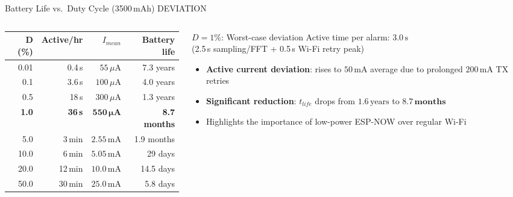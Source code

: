 \begin{frame}[shrink=15]{Battery Life vs.\ Duty Cycle (3500\,mAh) DEVIATION}
\begin{columns}[T,onlytextwidth]
\begin{column}{0.60\textwidth}
\centering
\renewcommand{\arraystretch}{1.5}
{\small
\setlength{\tabcolsep}{8pt}
\begin{tabular}{r r r r}
\toprule
\textbf{D (\%)} & \textbf{Active/hr} & \textbf{$I_{mean}$} & \textbf{Battery life} \\
\midrule
0.01 & 0.4\,s  & $55\,\mu\text{A}$  & 7.3 years \\
0.1  & 3.6\,s  & $100\,\mu\text{A}$ & 4.0 years \\
0.5  & 18\,s   & $300\,\mu\text{A}$ & 1.3 years \\
\rowcolor{sintefred!30}
\textbf{1.0} & \textbf{36\,s} & $\mathbf{550\,\mu\text{A}}$ & \textbf{8.7 months} \\
5.0  & 3\,min  & $2.55\,\text{mA}$  & 1.9 months \\
10.0 & 6\,min  & $5.05\,\text{mA}$  & 29 days \\
20.0 & 12\,min & $10.0\,\text{mA}$  & 14.5 days \\
50.0 & 30\,min & $25.0\,\text{mA}$  & 5.8 days \\
\bottomrule
\end{tabular}
}
\end{column}
\begin{column}{0.36\textwidth}
  \begin{block}{$D = 1\%$: Worst-case deviation}
  \small Active time per alarm: $3.0\,\text{s}$\\
  (2.5\,s sampling/FFT + 0.5\,s Wi-Fi retry peak)
  \end{block}
  \vspace{0.4cm}
  \begin{itemize}\setlength\itemsep{8pt}
  \small
    \item \textbf{Active current deviation}: rises to $50\,\text{mA}$ average due to prolonged $200\,\text{mA}$ TX retries
    \item \textbf{Significant reduction}: $t_{life}$ drops from $1.6\,\text{years}$ to $\mathbf{8.7\,\text{months}}$
    \item Highlights the importance of low-power ESP-NOW over regular Wi-Fi
  \end{itemize}
\end{column}
\end{columns}


\end{frame}
